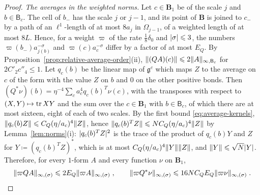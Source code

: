 \documentclass[11pt]{preprint}
\DeclarePairedDelimiter{\abs}{\lvert}{\rvert}
\DeclarePairedDelimiter{\norm}{\lVert}{\rVert}
\numberwithin{equation}{section}
\begin{document}
\begin{proof}
\emph{The averages in the weighted norms.} Let $c \in \mathbf B_1$ be of the scale $j$ and $b \in \mathsf B_c$. The cell of $b_-$ has the scale $j$ or $j - 1$, and its point of $\mathbf B$ is joined to $c_-$ by a path of an $\ell^1$-length of at most $8a_j$ in $\Omega_{j-1}$, of a weighted length of at most $8L$. Hence, for a weight $\varpi$ of the rate $\frac{1}{8}\delta_0$ and $\abs\sigma \leqslant 3$, the numbers $\varpi(b_-)a_{j(b)}^{-\sigma}$ and $\varpi(c)a_c^{-\sigma}$ differ by a factor of at most $E_Q$. By Proposition~\ref{prop:relative-average-order}(ii), $\norm{(QA)(c)} \leqslant 2\norm A_{\infty,\mathsf B_c}$ for $2C'_2c''_4 \leqslant 1$. Let $q_c(b)$ be the linear map of $\mathfrak g^c$ which maps $Z$ to the average on $c$ of the form with the value $Z$ on $b$ and $0$ on the other positive bonds. Then $(Q^*\nu)(b) = \eta^{-4}\sum_ca_c^4q_c(b)^T\nu(c)$, with the transposes with respect to $(X, Y) \mapsto \operatorname{tr} XY$ and the sum over the $c \in \mathbf B_1$ with $b \in \mathsf B_c$, of which there are at most sixteen, eight of each of two scales. By the first bound \eqref{eq:average-kernels}, $\norm{q_c(b)Z} \leqslant C_Q(\eta/a_c)^4\norm Z$, hence $\norm{q_c(b)^TZ} \leqslant NC_Q(\eta/a_c)^4\norm Z$ by Lemma~\ref{lem:norms}(i): $\abs{q_c(b)^TZ}^2$ is the trace of the product of $q_c(b)Y$ and $Z$ for $Y \coloneqq (q_c(b)^TZ)^*$, which is at most $C_Q(\eta/a_c)^4\norm Y\norm Z$, and $\norm Y \leqslant \sqrt N\abs Y$. Therefore, for every $1$-form $A$ and every function $\nu$ on $\mathbf B_1$,
\begin{equation}\label{eq:average-weighted}
    \norm{\varpi QA}_{\infty,(\sigma)} \leqslant 2E_Q\norm{\varpi A}_{\infty,(\sigma)}\;,
    \qquad
    \norm{\varpi Q^*\nu}_{\infty,(\sigma)} \leqslant 16NC_QE_Q\norm{\varpi\nu}_{\infty,(\sigma)}\;.
\end{equation}


\end{proof}
\end{document}
